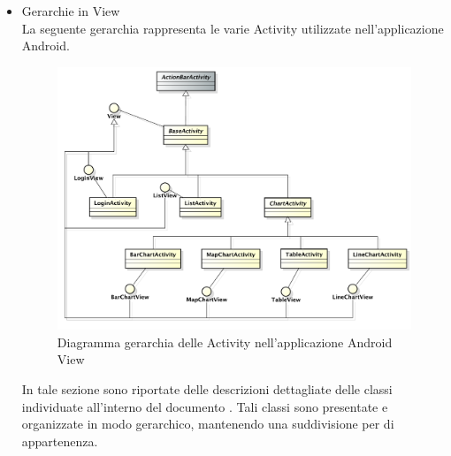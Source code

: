 \begin{itemize}
\begin{figure}[H]
                    \end{figure}
                \item Gerarchie in View \\
                    La seguente gerarchia rappresenta le varie Activity utilizzate nell'applicazione Android.
                    \begin{figure}[H]
                        \centering
                        \includegraphics{DefinizioneDiProdotto/Pics/Gerarchie/ApplicazioneActivity.pdf}
                        \caption{Diagramma gerarchia delle Activity nell'applicazione Android View}
                    \end{figure}
        In tale sezione sono riportate delle descrizioni dettagliate delle classi individuate all'interno del documento . Tali classi sono presentate e organizzate in modo gerarchico, mantenendo una suddivisione per  di appartenenza.
        
        


\end{itemize}
